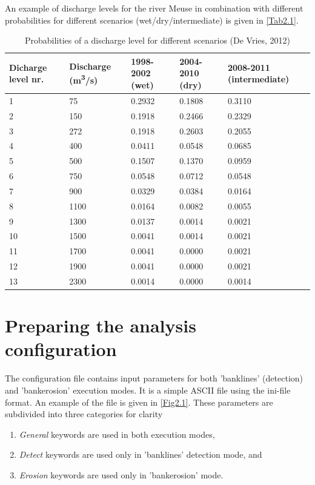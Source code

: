 An example of discharge levels for the river Meuse in combination with different probabilities for different scenarios (wet/dry/intermediate) is given in \autoref{Tab2.1}.

\begin{table}
\center
\begin{tabular}{p{2cm}p{2cm}p{2cm}p{2cm}p{2cm}}
Dicharge level nr. & Discharge (m\textsuperscript{3}/s) & 1998-2002 (wet) & 2004-2010 (dry) & 2008-2011 (intermediate) \\ \hline
1 & 75 & 0.2932 & 0.1808 & 0.3110 \\
2 & 150 & 0.1918 & 0.2466 & 0.2329 \\
3 & 272 & 0.1918 & 0.2603 & 0.2055 \\
4 & 400 & 0.0411 & 0.0548 & 0.0685 \\
5 & 500 & 0.1507 & 0.1370 & 0.0959 \\
6 & 750 & 0.0548 & 0.0712 & 0.0548 \\
7 & 900 & 0.0329 & 0.0384 & 0.0164 \\
8 & 1100 & 0.0164 & 0.0082 & 0.0055 \\
9 & 1300 & 0.0137 & 0.0014 & 0.0021 \\
10 & 1500 & 0.0041 & 0.0014 & 0.0021 \\
11 & 1700 & 0.0041 & 0.0000 & 0.0021 \\
12 & 1900 & 0.0041 & 0.0000 & 0.0021 \\
13 & 2300 & 0.0014 & 0.0000 & 0.0014 \\ \hline
\end{tabular}
\caption{Probabilities of a discharge level for different scenarios (De Vries, 2012)}
\label{Tab2.1}
\end{table}

\section{Preparing the analysis configuration}\label{Sec2.4}

The configuration file contains input parameters for both 'banklines' (detection) and 'bankerosion' execution modes.
It is a simple ASCII file using the ini-file format.
An example of the file is given in \autoref{Fig2.1}.
These parameters are subdivided into three categories for clarity

\begin{enumerate}
\item \emph{General} keywords are used in both execution modes,
\item \emph{Detect} keywords are used only in 'banklines' detection mode, and
\item \emph{Erosion} keywords are used only in 'bankerosion' mode.
\end{enumerate}


